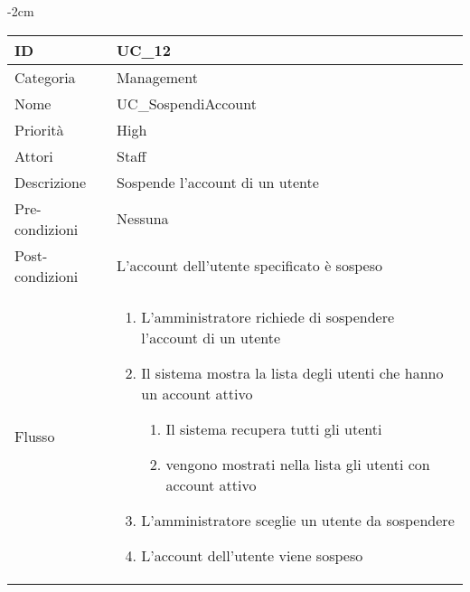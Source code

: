 \begin{center}
\begin{table}[bp]
    \centering
    \addtolength{\leftskip} {-2cm}
\begin{tabular}{ |p{2.6cm}|p{13cm}|  }
\hline
ID & UC\_12 \\\hline
Categoria & Management\\\hline
Nome & UC\_SospendiAccount\\\hline
Priorità & High \\\hline
Attori &  Staff \\\hline
Descrizione & Sospende l'account di un utente\\\hline
Pre-condizioni &  Nessuna\\\hline
Post-condizioni &  L'account dell'utente specificato è sospeso\\\hline
Flusso &  	
		\vspace{-5mm} \begin{enumerate}
		\item L'amministratore richiede di sospendere l'account di un utente
		\item Il sistema mostra la lista degli utenti che hanno un account attivo
			\begin{enumerate}[  ]
			\item Il sistema recupera tutti gli utenti
			\item vengono mostrati nella lista gli utenti con account attivo
			\end{enumerate}	
		\item L'amministratore sceglie un utente da sospendere
		\item L'account dell'utente viene sospeso
		\end{enumerate}\\\hline
\end{tabular}
\label{table_use_case:12}\newline
\end{table}



\end{center}
